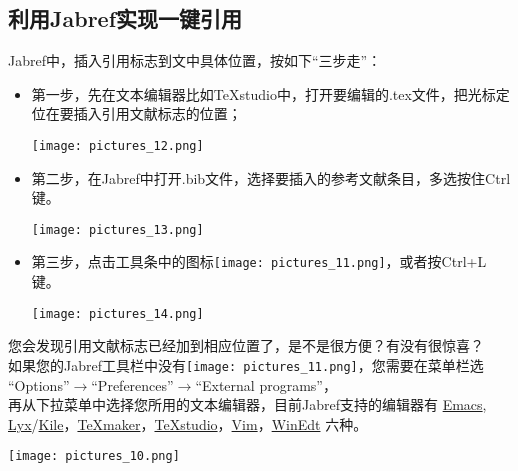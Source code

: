 \documentclass[cn,geye,cyan,normal,14pt]{elegantnote}
\begin{document}
\subsection{利用Jabref实现一键引用}
	Jabref中，插入引用标志到文中具体位置，按如下“三步走”：
		\begin{itemize}
			\item 第一步，先在文本编辑器比如\TeX studio中，打开要编辑的.tex文件，把光标定位在要插入引用文献标志的位置；
			\begin{center}
			\texttt{[image: pictures\_12.png]}
			\end{center}
		\item 第二步，在Jabref中打开.bib文件，选择要插入的参考文献条目，多选按住Ctrl键。
			\begin{center}
			\texttt{[image: pictures\_13.png]}
			\end{center}
		\item 第三步，点击工具条中的图标\texttt{[image: pictures\_11.png]}，或者按Ctrl+L键。
			\begin{center}
			\texttt{[image: pictures\_14.png]}
			\end{center}
		\end{itemize}
您会发现引用文献标志已经加到相应位置了，是不是很方便？有没有很惊喜？\\
如果您的Jabref工具栏中没有\texttt{[image: pictures\_11.png]}，您需要在菜单栏选\\
``Options''$\to$``Preferences''$\to$``External programs''，\\
再从下拉菜单中选择您所用的文本编辑器，目前Jabref支持的编辑器有 \href{https://ftp.gnu.org/gnu/emacs/}{Emacs}, \href{https://www.lyx.org/}{Lyx}/\href{https://kile.sourceforge.io/}{Kile}，\href{https://www.xm1math.net/texmaker/}{\TeX maker}，\href{https://github.com/texstudio-org/texstudio/releases}{\TeX studio}，\href{https://github.com/vim/vim/releases}{Vim}，\href{http://www.winedt.com/}{WinEdt} 六种。
			\begin{center}
			\texttt{[image: pictures\_10.png]}
			\end{center}
\end{document}
